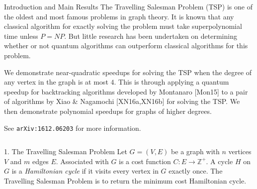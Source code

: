 \documentclass[]{templates/poster}
\begin{document}

\begin{frame}{} 

\begin{columns}[t]
  \begin{column}{0.900\linewidth}
  \begin{block}{\Large Introduction and Main Results}
  The Travelling Salesman Problem (TSP) is one of the oldest and most famous problems in graph theory. It is known that any classical algorithm for exactly solving the problem must take superpolynomial time unless $P = NP$. But little research has been undertaken on determining whether or not quantum algorithms can outperform classical algorithms for this problem.
  
  We demonstrate near-quadratic speedups for solving the TSP when the degree of any vertex in the graph is at most $4$. This is through applying a quantum speedup for backtracking algorithms developed by Montanaro [Mon15] to a pair of algorithms by Xiao \& Nagamochi [XN16a,XN16b] for solving the TSP. We then demonstrate polynomial speedups for graphs of higher degrees. 
  
  See {\tt arXiv:1612.06203} for more information.
  \end{block}
  \end{column}
\end{columns}

\begin{columns}[t]
  \begin{column}{0.422\linewidth}
  \begin{block}{\Large 1. The Travelling Salesman Problem}
  Let $G = (V, E)$ be a graph with $n$ vertices $V$ and $m$ edges $E$. Associated with $G$ is a cost function $C \colon E \rightarrow \mathbb{Z}^+$. A cycle $H$ on $G$ is a {\em Hamiltonian cycle} if it visits every vertex in $G$ exactly once. The Travelling Salesman Problem is to return the minimum cost Hamiltonian cycle.
  

\end{block}
\end{column}
\end{columns}
\end{frame}
\end{document}
